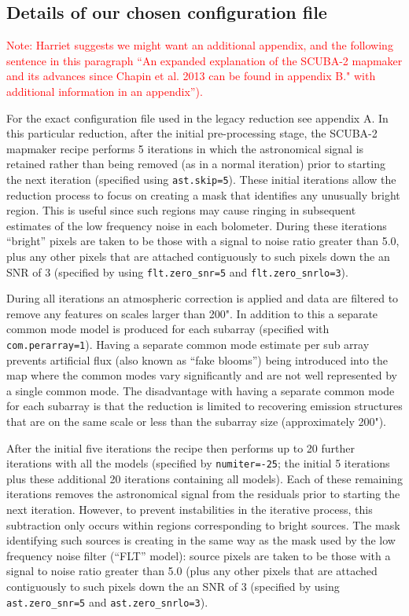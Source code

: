 \documentclass[twocolumn]{aastex6}
\newcommand{\note}[1]{\textcolor{red}{Note: #1}}
\begin{document}
\subsection{Details of our chosen configuration file}

\note{Harriet suggests we might want an additional appendix, and the
  following sentence in this paragraph ``An expanded explanation of
  the SCUBA-2 mapmaker and its advances since Chapin et al. 2013 can
  be found in appendix B." with additional information in an
  appendix'').}



For the exact configuration file used in the legacy reduction see
appendix A. In this particular reduction, after the initial
pre-processing stage, the SCUBA-2 mapmaker recipe performs 5
iterations in which the astronomical signal is retained rather than
being removed (as in a normal iteration) prior to starting the next
iteration (specified using \texttt{ast.skip=5}). These initial
iterations allow the reduction process to focus on creating a mask
that identifies any unusually bright region. This is useful since such
regions may cause ringing in subsequent estimates of the low frequency
noise in each bolometer. During these iterations ``bright'' pixels are
taken to be those with a signal to noise ratio greater than 5.0, plus
any other pixels that are attached contiguously to such pixels down
the an SNR of 3 (specified by using \texttt{flt.zero\_snr=5} and
\texttt{flt.zero\_snrlo=3}).

During all iterations an atmospheric correction is applied and data
are filtered to remove any features on scales larger than 200". In
addition to this a separate common mode model is produced for each
subarray (specified with \texttt{com.perarray=1}). Having a separate
common mode estimate per sub array prevents artificial flux (also
known as ``fake blooms'') being introduced into the map where the
common modes vary significantly and are not well represented by a
single common mode. The disadvantage with having a separate common
mode for each subarray is that the reduction is limited to recovering
emission structures that are on the same scale or less than the
subarray size (approximately 200").

After the initial five iterations the recipe then performs up to 20
further iterations with all the models (specified by
\texttt{numiter=-25}; the initial 5 iterations plus these additional 20
iterations containing all models). Each of these remaining iterations
removes the astronomical signal from the residuals prior to starting
the next iteration. However, to prevent instabilities in the iterative
process, this subtraction only occurs within regions corresponding to
bright sources.  The mask identifying such sources is creating in the
same way as the mask used by the low frequency noise filter (``FLT''
model): source pixels are taken to be those with a signal to noise
ratio greater than 5.0 (plus any other pixels that are attached
contiguously to such pixels down the an SNR of 3 (specified by using
\texttt{ast.zero\_snr=5} and \texttt{ast.zero\_snrlo=3}).
\end{document}
